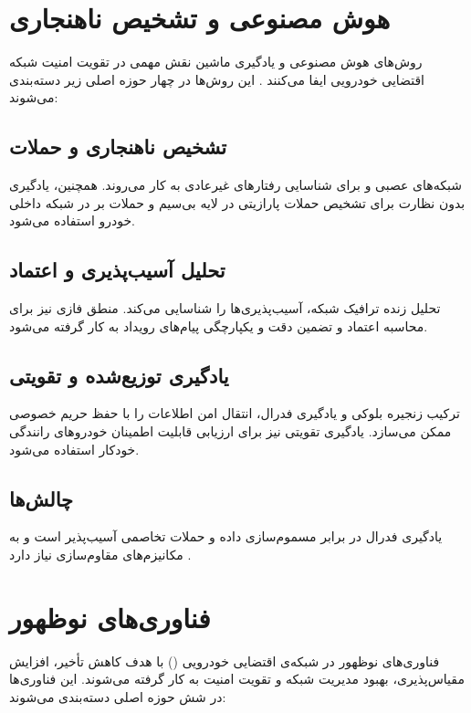 \documentclass[12pt,a4paper]{article}
\begin{document}
\section{هوش مصنوعی و تشخیص ناهنجاری}
روش‌های هوش مصنوعی و یادگیری ماشین نقش مهمی در تقویت امنیت شبکه اقتضایی خودرویی ایفا می‌کنند \cite{farsimadanReviewSecurityChallenges2025}. این روش‌ها در چهار حوزه اصلی زیر دسته‌بندی می‌شوند:

\subsection{تشخیص ناهنجاری و حملات}
شبکه‌های عصبی  و  برای شناسایی رفتارهای غیرعادی به کار می‌روند. همچنین، یادگیری بدون نظارت برای تشخیص حملات پارازیتی در لایه بی‌سیم و حملات بر  در شبکه داخلی خودرو استفاده می‌شود.

\subsection{تحلیل آسیب‌پذیری و اعتماد}
تحلیل زنده ترافیک شبکه، آسیب‌پذیری‌ها را شناسایی می‌کند. منطق فازی نیز برای محاسبه اعتماد و تضمین دقت و یکپارچگی پیام‌های رویداد به کار گرفته می‌شود.

\subsection{یادگیری توزیع‌شده و تقویتی}
ترکیب زنجیره بلوکی و یادگیری فدرال، انتقال امن اطلاعات را با حفظ حریم خصوصی ممکن می‌سازد. یادگیری تقویتی نیز برای ارزیابی قابلیت اطمینان خودروهای رانندگی خودکار استفاده می‌شود.

\subsection{چالش‌ها}
یادگیری فدرال در برابر مسموم‌سازی داده و حملات تخاصمی آسیب‌پذیر است و به مکانیزم‌های مقاوم‌سازی نیاز دارد \cite{farsimadanReviewSecurityChallenges2025}.

\section{فناوری‌های نوظهور}
فناوری‌های نوظهور در شبکه‌ی اقتضایی خودرویی () با هدف کاهش تأخیر، افزایش مقیاس‌پذیری، بهبود مدیریت شبکه و تقویت امنیت به کار گرفته می‌شوند. این فناوری‌ها در شش حوزه اصلی دسته‌بندی می‌شوند:
\end{document}
